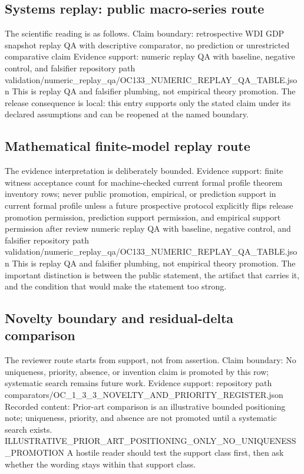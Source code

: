 \subsection{Systems replay: public macro-series route}
The scientific reading is as follows. Claim boundary: retrospective WDI GDP snapshot replay QA with descriptive comparator, no prediction or unrestricted comparative claim Evidence support: numeric replay QA with baseline, negative control, and falsifier repository path validation/numeric\_replay\_qa/OC133\_NUMERIC\_REPLAY\_QA\_TABLE.json This is replay QA and falsifier plumbing, not empirical theory promotion. The release consequence is local: this entry supports only the stated claim under its declared assumptions and can be reopened at the named boundary.

\subsection{Mathematical finite-model replay route}
The evidence interpretation is deliberately bounded. Evidence support: finite witness acceptance count for machine-checked current formal profile theorem inventory rows; never public promotion, empirical, or prediction support in current formal profile unless a future prospective protocol explicitly flips release promotion permission, prediction support permission, and empirical support permission after review numeric replay QA with baseline, negative control, and falsifier repository path validation/numeric\_replay\_qa/OC133\_NUMERIC\_REPLAY\_QA\_TABLE.json This is replay QA and falsifier plumbing, not empirical theory promotion. The important distinction is between the public statement, the artifact that carries it, and the condition that would make the statement too strong.

\subsection{Novelty boundary and residual-delta comparison}
The reviewer route starts from support, not from assertion. Claim boundary: No uniqueness, priority, absence, or invention claim is promoted by this row; systematic search remains future work. Evidence support: repository path comparators/OC\_1\_3\_3\_NOVELTY\_AND\_PRIORITY\_REGISTER.json Recorded content: Prior-art comparison is an illustrative bounded positioning note; uniqueness, priority, and absence are not promoted until a systematic search exists. ILLUSTRATIVE\_PRIOR\_ART\_POSITIONING\_ONLY\_NO\_UNIQUENESS\_PROMOTION A hostile reader should test the support class first, then ask whether the wording stays within that support class.
